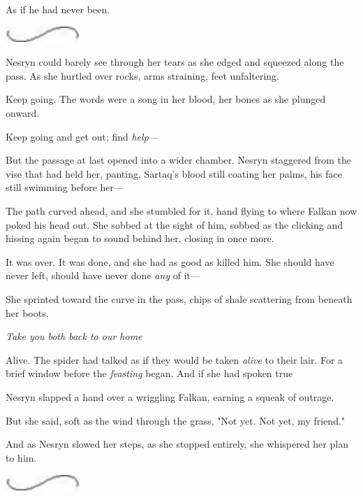 As if he had never been.

\begin{center}
	\includegraphics[width=1.12in,height=0.24in]{images/seperator}
\end{center}

Nesryn could barely see through her tears as she edged and squeezed along the pass.
As she hurtled over rocks, arms straining, feet unfaltering.

Keep going.
The words were a song in her blood, her bones as she plunged onward.

Keep going and get out; find \emph{help}---

But the passage at last opened into a wider chamber.
Nesryn staggered from the vise that had held her, panting, Sartaq's blood still coating her palms, his face still swimming before her---

The path curved ahead, and she stumbled for it, hand flying to where Falkan now poked his head out.
She sobbed at the sight of him, sobbed as the clicking and hissing again began to sound behind her, closing in once more.

It was over.
It was done, and she had as good as killed him.
She should have never left, should have never done \emph{any} of it---

She sprinted toward the curve in the pass, chips of shale scattering from beneath her boots.

\emph{Take you both back to our home }

Alive.
The spider had talked as if they would be taken \emph{alive} to their lair.
For a brief window before the \emph{feasting} began.
And if she had spoken true 

Nesryn slapped a hand over a wriggling Falkan, earning a squeak of outrage.

But she said, soft as the wind through the grass, "Not yet.
Not yet, my friend."

And as Nesryn slowed her steps, as she stopped entirely, she whispered her plan to him.

\begin{center}
	\includegraphics[width=1.12in,height=0.24in]{images/seperator}
\end{center}

